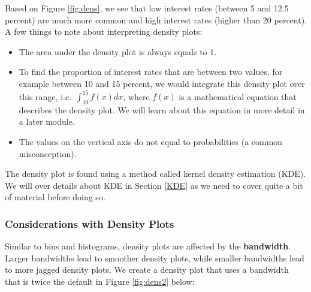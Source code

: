 \documentclass[
]{book}
\newenvironment{Shaded}{\begin{snugshade}}{\end{snugshade}}
\newcommand{\AttributeTok}[1]{\textcolor[rgb]{0.13,0.29,0.53}{#1}}
\newcommand{\DecValTok}[1]{\textcolor[rgb]{0.00,0.00,0.81}{#1}}
\newcommand{\FunctionTok}[1]{\textcolor[rgb]{0.13,0.29,0.53}{\textbf{#1}}}
\newcommand{\NormalTok}[1]{#1}
\newcommand{\SpecialCharTok}[1]{\textcolor[rgb]{0.81,0.36,0.00}{\textbf{#1}}}
\newcommand{\StringTok}[1]{\textcolor[rgb]{0.31,0.60,0.02}{#1}}
\providecommand{\tightlist}{%
  \setlength{\itemsep}{0pt}\setlength{\parskip}{0pt}}
\begin{document}
Based on Figure \ref{fig:dens}, we see that low interest rates (between 5 and 12.5 percent) are much more common and high interest rates (higher than 20 percent). A few things to note about interpreting density plots:

\begin{itemize}
\tightlist
\item
  The area under the density plot is always equals to 1.
\item
  To find the proportion of interest rates that are between two values, for example between 10 and 15 percent, we would integrate this density plot over this range, i.e.~\(\int_{10}^{15} f(x) dx\), where \(f(x)\) is a mathematical equation that describes the density plot. We will learn about this equation in more detail in a later module.
\item
  The values on the vertical axis do not equal to probabilities (a common misconception).
\end{itemize}

The density plot is found using a method called kernel density estimation (KDE). We will over details about KDE in Section \ref{KDE} as we need to cover quite a bit of material before doing so.

\subsubsection{Considerations with Density Plots}\label{considerations-with-density-plots}

Similar to bins and histograms, density plots are affected by the \textbf{bandwidth}. Larger bandwidths lead to smoother density plots, while smaller bandwidths lead to more jagged density plots. We create a density plot that uses a bandwidth that is twice the default in Figure \ref{fig:dens2} below:

\begin{Shaded}
\end{Shaded}
\end{document}
